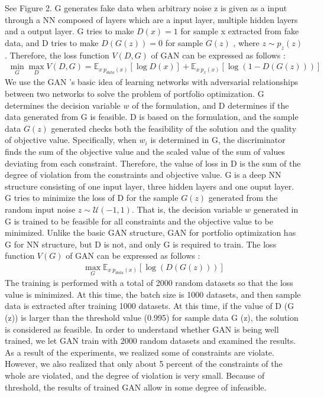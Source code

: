\documentclass[11pt]{article}
\begin{document}
\begin{itemize}
See Figure 2. G generates fake data when arbitrary noise z is given as a input through a NN composed of layers which are a input layer, multiple hidden layers and a output layer. G tries to make $D(x) = 1$ for sample x extracted from fake data, and D tries to make $D(G (z)) = 0$ for sample $G (z)$ , where $z \sim p_{z}(z)$. Therefore, the loss function $V(D,G)$ of GAN can be expressed as follows : %
 \begin{align*}
 \min_G \max_D V(D,G)  = \mathbb{E}_{x~p_{data}(x)}[\log D(x)]  + \mathbb{E}_{x~p_{x}(x)}[\log(1-D(G(z)))] 
 \end{align*}
 We use the GAN 's basic idea of learning networks with adversarial relationships between two networks to solve the problem of portfolio optimization. G determines the decision variable $w$ of the formulation, and D determines if the data generated from G is feasible. D is based on the formulation, and the sample data $G(z)$ generated checks both the feasibility of the solution and the quality of objective value. Specifically, when $ w_i $ is determined in G, the discriminator finds the sum of the objective value and the scaled value of the sum of values deviating from each constraint. Therefore, the value of loss in D is the sum of the degree of violation from the constraints and objective value. G is a deep NN structure consisting of one input layer, three hidden layers and one ouput layer. G tries to minimize the loss of D for the sample $G(z)$ generated from the random input noise $z \sim \mathcal {U}(-1,1)$. That is, the decision variable $ w $ generated in G is trained to be feasible for all constraints and the objective value to be minimized. Unlike the basic GAN structure, GAN for portfolio optimization has G for NN structure, but D is not, and only G is required to train. The loss function $V(G)$ of GAN can be expressed as follows :
 \begin{align*}
 \max_G \mathbb{E}_{x~p_{data}(x)}[\log(D(G(z)))] 
 \end{align*}
 The training is performed with a total of 2000 random datasets so that the loss value is minimized. At this time, the batch size is 1000 datasets, and then sample data is extracted after training 1000 datasets. At this time, if the value of D (G (z)) is larger than the threshold value (0.995) for sample data G (z), the solution is considered as feasible. 
In order to understand whether GAN is being well trained, we let GAN train with 2000 random datasets and examined the results. As a result of the experiments, we realized some of constraints are violate. However, we also realized that only about 5 percent of the constraints of the whole are violated, and the degree of violation is very small. Because of threshold, the results of trained GAN allow in some degree of infeasible. 



\end{itemize}
\end{document}

